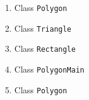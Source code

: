 \begin{enumerate}
	\item Class \texttt{Polygon}
	
	\item Class \texttt{Triangle}
	
	\item Class \texttt{Rectangle}
	
	\item Class \texttt{PolygonMain}
	
	\item Class \texttt{Polygon}
	
\end{enumerate}

\begin{appendix}
	\listoffigures
	\listoftables
\end{appendix}

